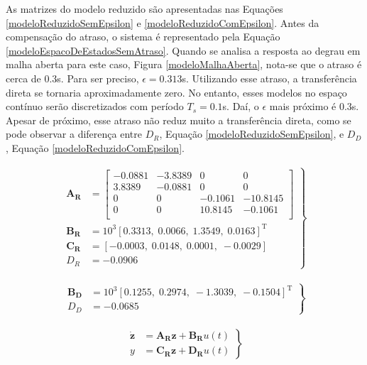 As matrizes do modelo reduzido são apresentadas nas Equações \ref{modeloReduzidoSemEpsilon} e \ref{modeloReduzidoComEpsilon}. Antes da compensação do atraso, o sistema é representado pela Equação \ref{modeloEspacoDeEstadosSemAtraso}. Quando se analisa a resposta ao degrau em malha aberta para este caso, Figura \ref{modeloMalhaAberta}, nota-se que o atraso é cerca de 0.3s. Para ser preciso, $\epsilon = 0.313$s. Utilizando esse atraso, a transferência direta se tornaria aproximadamente zero. No entanto, esses modelos no espaço contínuo serão discretizados com período $T_s = 0.1$s. Daí, o $\epsilon$ mais próximo é 0.3s. Apesar de próximo, esse atraso não reduz muito a transferência direta, como se pode observar a diferença entre $D_R$, Equação \ref{modeloReduzidoSemEpsilon}, e $D_D$, Equação \ref{modeloReduzidoComEpsilon}.

\begin{align}
\left.\begin{array}{ll}
	\mathbf{A_R} &= \left[\begin{array}{cccc}
		-0.0881  & -3.8389 &         0 &         0\\
    3.8389 &   -0.0881 &         0 &         0\\
         0 &         0 &   -0.1061 &  -10.8145\\
         0 &        0 &   10.8145 &   -0.1061\\
	\end{array}\right]\\
	\mathbf{B_R} &= 10^3\left[0.3313,\;
    0.0066,\;
    1.3549,\;
    0.0163\right]^{\mathrm{T}}\\
	\mathbf{C_R} &= \left[-0.0003,\;0.0148,\;0.0001,\;-0.0029\right]\\
	D_R &= -0.0906
\end{array}\right\} \label{modeloReduzidoSemEpsilon}
\end{align}

\begin{align}
\left.\begin{array}{ll}
	\mathbf{B_D} &= 10^3\left[0.1255,\;
    0.2974,\;
   -1.3039,\;
   -0.1504\right]^{\mathrm{T}}\\
	D_D &= -0.0685
\end{array}\right\} \label{modeloReduzidoComEpsilon}
\end{align}

\begin{align}
	\left.\begin{array}{ll}
		\mathbf{\dot{z}} &= \mathbf{A_R}\mathbf{z} + \mathbf{B_R}u(t)\\
		y &= \mathbf{C_R}\mathbf{z} + \mathbf{D_R}u(t)
	\end{array}\right\}\label{modeloEspacoDeEstadosSemAtraso}
\end{align}

